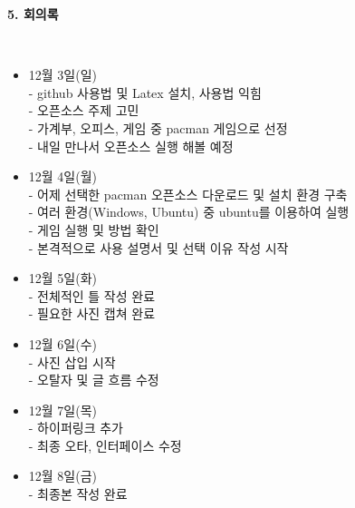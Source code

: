 \documentclass{article}
\begin{document}
\newpage
\begin{large}\textbf{5. 회의록}\end{large}\\
\begin{itemize}
\item 12월 3일(일)\\
 
- github 사용법 및 Latex 설치, 사용법 익힘\\
 
- 오픈소스 주제 고민\\
 
- 가계부, 오피스, 게임 중 pacman 게임으로 선정\\
 
- 내일 만나서 오픈소스 실행 해볼 예정\\
 
\item 12월 4일(월)\\
 
- 어제 선택한 pacman 오픈소스 다운로드 및 설치 환경 구축\\
 
- 여러 환경(Windows, Ubuntu) 중 ubuntu를 이용하여 실행\\
 
- 게임 실행 및 방법 확인\\
 
- 본격적으로 사용 설명서 및 선택 이유 작성 시작\\
 
\item 12월 5일(화)\\
 
 - 전체적인 틀 작성 완료\\
 
 - 필요한 사진 캡쳐 완료\\
 
\item 12월 6일(수)\\
 
 - 사진 삽입 시작\\
 
 - 오탈자 및 글 흐름 수정\\
 
\item 12월 7일(목)\\

 - 하이퍼링크 추가\\

- 최종 오타, 인터페이스 수정\\

\item 12월 8일(금)\\

 - 최종본 작성 완료\\

\end{itemize}
\end{document}
